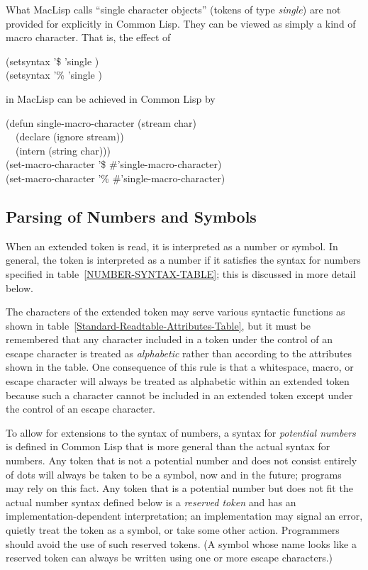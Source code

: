 \begin{incompatibility}
What MacLisp calls ``single character objects''
(tokens of type {\it single}) are not provided for explicitly in Common Lisp.
They can be viewed as simply a kind of macro character.
That is, the effect of
\begin{lisp}
(setsyntax '\$ 'single {\false}) \\
(setsyntax '\% 'single {\false})
\end{lisp}
in MacLisp can be achieved in Common Lisp by
\begin{lisp}
(defun single-macro-character (stream char) \\
~~(declare (ignore stream)) \\
~~(intern (string char))) \\
(set-macro-character '\$ \#'single-macro-character) \\
(set-macro-character '\% \#'single-macro-character)
\end{lisp}
\end{incompatibility}
\afternoterule


\subsection{Parsing of Numbers and Symbols}
\label{PARSE-TOKENS-SECTION}

When an extended token is read, it is interpreted as a number or symbol.
In general, the token is interpreted as a number if it satisfies
the syntax for numbers specified in table~\ref{NUMBER-SYNTAX-TABLE};
this is discussed in more detail below.

The characters of the extended token may serve various syntactic
functions as shown
in table~\ref{Standard-Readtable-Attributes-Table}, but it must be
remembered that any character included in a token under the control
of an escape character is treated as {\it alphabetic} rather than
according to the attributes shown in the table.
One consequence of this rule is that a whitespace, macro, or escape
character will always be treated as alphabetic within an extended token
because such a character cannot be included in an extended
token except under the control of an escape character.

To allow for extensions to the syntax of numbers, a
syntax for {\it potential numbers} is defined in Common Lisp that is
more general than the actual syntax for numbers.
Any token that is not a potential number and does not consist
entirely of dots will always be taken to be a symbol,
now and in the future; programs may rely on this fact.
Any token that is a potential number but does not fit the
actual number syntax defined below is a {\it reserved token} and
has an implementation-dependent interpretation;
an implementation may signal an error, quietly treat the token
as a symbol, or take some other action.  Programmers should avoid
the use of such reserved tokens.  (A symbol whose name looks like a reserved
token can always be written using one or more escape characters.)

